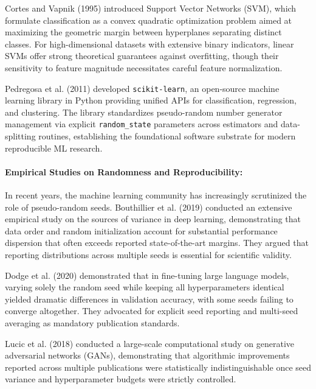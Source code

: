 Cortes and Vapnik (1995) \cite{cortes1995support} introduced Support Vector Networks (SVM), which formulate classification as a convex quadratic optimization problem aimed at maximizing the geometric margin between hyperplanes separating distinct classes. For high-dimensional datasets with extensive binary indicators, linear SVMs offer strong theoretical guarantees against overfitting, though their sensitivity to feature magnitude necessitates careful feature normalization.

Pedregosa et al. (2011) \cite{pedregosa2011scikit} developed \texttt{scikit-learn}, an open-source machine learning library in Python providing unified APIs for classification, regression, and clustering. The library standardizes pseudo-random number generator management via explicit \texttt{random\_state} parameters across estimators and data-splitting routines, establishing the foundational software substrate for modern reproducible ML research.

\paragraph{Empirical Studies on Randomness and Reproducibility:}
In recent years, the machine learning community has increasingly scrutinized the role of pseudo-random seeds. Bouthillier et al. (2019) \cite{bouthillier2019unreproducible} conducted an extensive empirical study on the sources of variance in deep learning, demonstrating that data order and random initialization account for substantial performance dispersion that often exceeds reported state-of-the-art margins. They argued that reporting distributions across multiple seeds is essential for scientific validity.

Dodge et al. (2020) \cite{dodge2020fine} demonstrated that in fine-tuning large language models, varying solely the random seed while keeping all hyperparameters identical yielded dramatic differences in validation accuracy, with some seeds failing to converge altogether. They advocated for explicit seed reporting and multi-seed averaging as mandatory publication standards.

Lucic et al. (2018) \cite{lucic2018gans} conducted a large-scale computational study on generative adversarial networks (GANs), demonstrating that algorithmic improvements reported across multiple publications were statistically indistinguishable once seed variance and hyperparameter budgets were strictly controlled.

